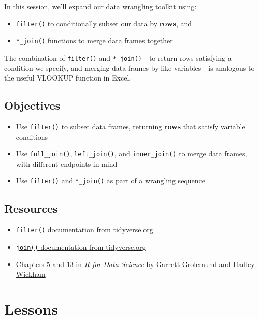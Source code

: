 \documentclass[]{book}
\providecommand{\tightlist}{%
  \setlength{\itemsep}{0pt}\setlength{\parskip}{0pt}}
\begin{document}
In this session, we'll expand our data wrangling toolkit using:

\begin{itemize}
\tightlist
\item
  \texttt{filter()} to conditionally subset our data by \textbf{rows}, and
\item
  \texttt{*\_join()} functions to merge data frames together
\end{itemize}

The combination of \texttt{filter()} and \texttt{*\_join()} - to return rows satisfying a condition we specify, and merging data frames by like variables - is analogous to the useful VLOOKUP function in Excel.

\hypertarget{objectives-6}{%
\subsection{Objectives}\label{objectives-6}}

\begin{itemize}
\tightlist
\item
  Use \texttt{filter()} to subset data frames, returning \textbf{rows} that satisfy variable conditions
\item
  Use \texttt{full\_join()}, \texttt{left\_join()}, and \texttt{inner\_join()} to merge data frames, with different endpoints in mind
\item
  Use \texttt{filter()} and \texttt{*\_join()} as part of a wrangling sequence
\end{itemize}

\hypertarget{resources-7}{%
\subsection{Resources}\label{resources-7}}

\begin{itemize}
\tightlist
\item
  \href{https://dplyr.tidyverse.org/reference/filter.html}{\texttt{filter()} documentation from tidyverse.org}
\item
  \href{https://dplyr.tidyverse.org/reference/join.html}{\texttt{join()} documentation from tidyverse.org}
\item
  \href{https://r4ds.had.co.nz/}{Chapters 5 and 13 in \emph{R for Data Science} by Garrett Grolemund and Hadley Wickham}
\end{itemize}

\hypertarget{lessons}{%
\section{Lessons}\label{lessons}}
\end{document}
